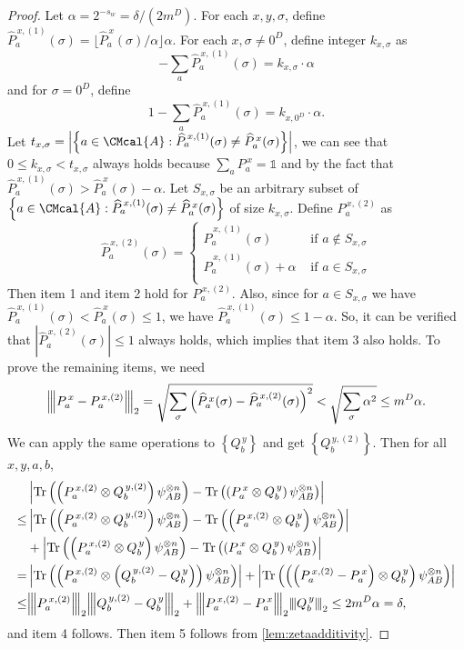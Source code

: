 \documentclass[11pt]{article}
\def\A{\CMcal{A}}
\theoremstyle{plain}
\theoremstyle{definition}
\newcommand {\set} [1] {\ensuremath{ \left\lbrace #1 \right\rbrace }}
\newcommand {\br} [1] {\ensuremath{ \left( #1 \right) }}
\newcommand {\ab} [1] {\ensuremath{ \left| #1 \right| }}
\newcommand{\nnorm}[1]{{\left\vert\kern-0.25ex\left\vert\kern-0.25ex\left\vert #1
		\right\vert\kern-0.25ex\right\vert\kern-0.25ex\right\vert}}
\newcommand {\Tr} {\ensuremath{ \mathrm{Tr} }}
\newcommand {\id} {\ensuremath{\mathds{1}}}
\newcommand{\dlbo} {\ensuremath{{D}}}
\newcommand{\wireal} {\ensuremath{{s_{w}}}}
\newcommand{\Pss} {\ensuremath{P^{\,x}_a}}
\newcommand{\Qss} {\ensuremath{Q^{\,y}_b}}
\newcommand{\Pnn}[1] {\ensuremath{{P^{\,x, (#1)}_a}}}
\newcommand{\Qnn}[1] {\ensuremath{{Q^{\,y, (#1)}_b}}}
\newcommand{\Pff} {\ensuremath{\widehat{P}^{\,x}_a(\sigma)}}
\newcommand{\Pfn}[1] {\ensuremath{{{\widehat{P}}^{\,x, {(#1)}}_a}(\sigma)}}
\newcommand{\1}{\mathbb{1}} %
\begin{document}
\begin{proof}
    \newcommand{\tsms} {\alpha}
    Let $\tsms=2^{-\wireal}=\delta/(2m^D)$.
    For each $x, y, \sigma$, define $\Pfn{1} = \lfloor\Pff/\tsms\rfloor\tsms$.
    For each $x, \sigma\neq0^\dlbo$, define integer $k_{x, \sigma}$ as
    $$-\sum_{a}\Pfn{1} = k_{x, \sigma}\cdot\tsms$$
    and for $\sigma=0^D$, define
    $$1 - \sum_{a}\Pfn{1} = k_{x, 0^\dlbo}\cdot\tsms.$$
    Let $t_{x,\sigma}=\ab{\set{a\in\A: \Pfn{1}\neq \Pff}}$,
    we can see that $0\le k_{x, \sigma}< t_{x,\sigma}$ always holds because
    $\sum_{a}\Pss=\id$
    and by the fact that $\Pfn{1}>\Pff-\alpha$.
    Let $S_{x, \sigma}$ be an arbitrary subset of $\set{a\in\A: \Pfn{1}\neq \Pff}$ of size $k_{x,\sigma}$.
    Define $\Pnn{2}$ as
    $$\Pfn{2}=\begin{cases}
        \Pfn{1} &\text{ if } a \not\in S_{x,\sigma} \\
        \Pfn{1} + \tsms&\text{ if } a \in S_{x,\sigma} \\
    \end{cases}$$
    Then item 1 and item 2 hold for $\Pnn{2}$.
    Also, since for $a\in S_{x,\sigma}$ we have $\Pfn{1}< \Pff\le 1$, we have $\Pfn{1}\le1-\alpha$.
    So, it can be verified that $\ab{\Pfn{2}}\le1$ always holds, which implies that item 3 also holds.
    To prove the remaining items, we need
    $$\nnorm{\Pss-\Pnn{2}}_2 = \sqrt{\sum_{\sigma}\br{\Pff-\Pfn{2}}^2}
                                   <\sqrt{\sum_{\sigma}\tsms^2}\le m^D\tsms.$$
    We can apply the same operations to $\set{\Qss}$ and get $\set{\Qnn{2}}$.
    Then for all $x, y, a, b$,
    \begin{align*}
     &\ab{\Tr\br{\br{\Pnn{2}\otimes \Qnn{2}}\psi^{\otimes n}_{AB}}-\Tr\br{\br{\Pss\otimes \Qss}\psi^{\otimes n}_{AB}}} \\
  \le&\ab{\Tr\br{\br{\Pnn{2}\otimes \Qnn{2}}\psi^{\otimes n}_{AB}}-\Tr\br{\br{\Pnn{2}\otimes \Qss}\psi^{\otimes n}_{AB}}}\\ 
    &+\ab{\Tr\br{\br{\Pnn{2}\otimes \Qss}\psi^{\otimes n}_{AB}}-\Tr\br{\br{\Pss\otimes \Qss}\psi^{\otimes n}_{AB}}} \\
    =&\ab{\Tr\br{\br{\Pnn{2}\otimes \br{\Qnn{2}-\Qss}}\psi^{\otimes n}_{AB}}} +
      \ab{\Tr\br{\br{\br{\Pnn{2}-\Pss}\otimes \Qss}\psi^{\otimes n}_{AB}}} \\
 \leq&\nnorm{\Pnn{2}}_2\nnorm{\Qnn{2}-\Qss}_2 + \nnorm{\Pnn{2}-\Pss}_2\nnorm{\Qss}_2
 \leq2m^D\tsms=\delta,
    \end{align*}
    and item 4 follows.
    Then item 5 follows from \cref{lem:zetaadditivity}.
\end{proof}
\end{document}
